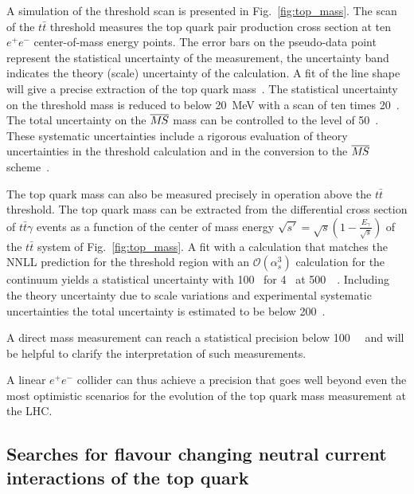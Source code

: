 A simulation of the threshold scan is presented in
Fig.~\ref{fig:top_mass}. The scan of the $t\bar t$ threshold measures the
top quark pair production cross section at ten $e^+e^-$ center-of-mass energy points. 
The error bars on the pseudo-data point represent the statistical uncertainty of
the measurement, the uncertainty band indicates the theory (scale) uncertainty 
of the calculation. A fit of the line shape will give
a precise extraction of the top quark mass~\cite{Martinez:2002st,Horiguchi:2013wra,Seidel:2013sqa}.
The statistical uncertainty on the threshold mass is reduced to 
below 20~MeV with a scan of ten times 20~\ifb. The total uncertainty 
on the $\msb$ mass can be controlled to the level
of 50~\MeV. These systematic uncertainties
include a rigorous evaluation of theory uncertainties in the 
threshold calculation and in the conversion
to the $\msb$ scheme~\cite{Simon:2016pwp}.

The top quark mass can also be measured precisely in operation above the $t\bar t$
threshold. The top quark mass can be extracted from the differential cross section of $t\bar t \gamma$  events as a function of the center of mass energy 
$\sqrt{s'} = \sqrt{s} ( 1 - \frac{E_{\gamma}}{\sqrt{s}})$ 
of the $t \bar t$ system of Fig.~\ref{fig:top_mass}. A fit with a calculation that matches the 
NNLL prediction for the threshold region with an $\mathcal{O} (\alpha_{s}^3)$ calculation for 
the continuum yields a statistical uncertainty with 100~\MeV{} for 4~\iab{} at 500~\GeV{}~\cite{Abramowicz:2018rjq}. Including the theory uncertainty due to scale variations
and experimental systematic uncertainties the total uncertainty is estimated to be below
200~\MeV. 

A direct mass 
measurement can reach a statistical precision below 100~\MeV{}~\cite{Seidel:2013sqa} and will 
be helpful to clarify the interpretation of such measurements.

A linear $e^+e^-$ collider
can thus achieve a precision that goes well beyond
even the most optimistic scenarios for the evolution 
of the top quark mass measurement at the LHC.

\subsection{Searches for flavour changing neutral current interactions of the top quark}
\label{subsec:top:fcnc}

